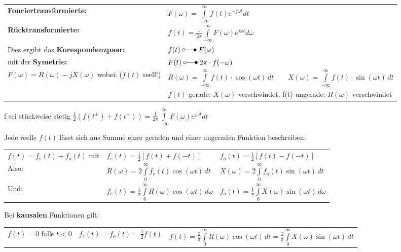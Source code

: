 		\vspace{-2mm}	%
		\begin{tabular}{|p{6cm} l|} \hline
			\textbf{Fouriertransformierte:} &
			$F(\omega) = \int\limits_{-\infty}^{\infty} f(t)e^{-j\omega t}dt$ \\
			\textbf{Rücktransformierte:} &
			$f(t) = \frac{1}{2\pi}\int\limits_{-\infty}^{\infty}F(\omega)e^{j\omega t}d\omega$ \\ \hline
		
		Dies ergibt das \textbf{Korespondenzpaar:} & $f(t) \; \laplace \; F(\omega)$ \\
		mit der \textbf{Symetrie:} & $F(t) \; \laplace \; 2\pi \cdot f(-\omega)$ \\
		
		$F(\omega) = R(\omega) -jX(\omega)$ wobei: ($f(t)$ reell!) &
		$R(\omega) = \int\limits_{-\infty}^\infty f(t)\cdot \cos(\omega t)\,dt \quad\quad X(\omega) =
		\int\limits_{-\infty}^\infty f(t)\cdot \sin(\omega t)\,dt$
		\\
		&$f(t)$ gerade: $X(\omega)$ verschwindet, f(t) ungerade: $R(\omega)$ verschwindet \\
		\hline
		\end{tabular}
		
		f sei stückweise stetig $\frac{1}{2}(f(t^+) + f(t^-)) = \frac{1}{2\pi} \int\limits_{-\infty}^{\infty}F(\omega)e^{j\omega t} dt$
		
		Jede reelle $f(t)$ lässt sich aus Summe einer geraden und einer ungeraden Funktion beschreiben:\\[3mm]
		\begin{tabular}{lll}
			$f(t) = f_e(t) + f_o(t)$ mit & $f_e(t) = \frac{1}{2}[f(t) + f(-t)]$ & $f_o(t) = \frac{1}{2}[f(t) - f(-t)]$ \\[3mm]
			
			Also: & $R(\omega) = 2 \int\limits_0^\infty f_e(t) \cos(\omega t)\,dt$ & $X(\omega) = 2 \int\limits_0^\infty
			f_o(t) \sin(\omega t)\,dt$ \\[3mm]
			
			Und: & $f_e(t) = \frac{1}{\pi}\int\limits_0^\infty R(\omega)\cos(\omega t)\,d\omega$ & 
			$f_o(t) = \frac{1}{\pi}\int\limits_0^\infty X(\omega)\sin(\omega t)\,d\omega$ \\[3mm]
		\end{tabular}
		
		Bei \textbf{kausalen} Funktionen gilt:\\
		\begin{tabular}{c c c}
			$f(t) = 0$ falls $t<0$ & 
			$f_e(t) = f_o(t) = \frac{1}{2}f(t)$ &
			$f(t) = \frac{2}{\pi}\int\limits_0^\infty R(\omega) \cos(\omega t)\,dt = \frac{2}{\pi}\int\limits_0^\infty X(\omega) \sin(\omega t)\,dt$
		\end{tabular}
			
